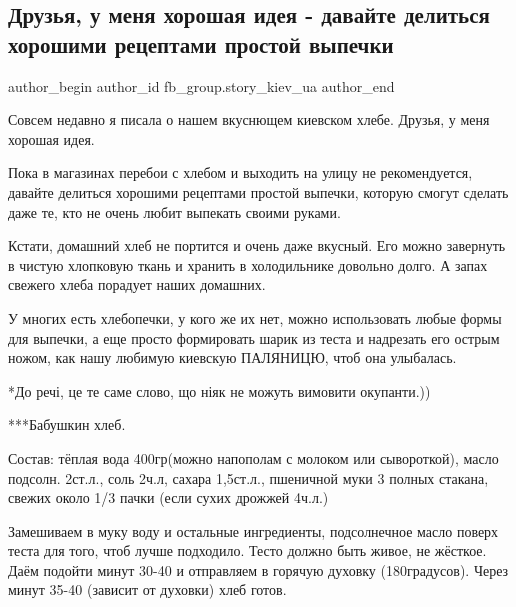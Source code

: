  
 
 
 
 
 
\subsection{Друзья, у меня хорошая идея - давайте делиться хорошими рецептами простой выпечки}
\label{sec:28_02_2022.fb.fb_group.story_kiev_ua.2.vypechka}
 
\ifcmt
 author_begin
   author_id fb_group.story_kiev_ua
 author_end
\fi

Совсем недавно я писала о нашем вкуснющем киевском хлебе. Друзья, у меня
хорошая идея. 

Пока в магазинах перебои с хлебом и выходить на улицу не рекомендуется, давайте
делиться хорошими рецептами простой выпечки, которую смогут сделать даже те,
кто не очень любит выпекать своими руками. 

Кстати, домашний хлеб не портится и очень даже вкусный. Его можно завернуть в
чистую хлопковую ткань и хранить в холодильнике довольно долго. А запах свежего
хлеба порадует наших домашних. 


У многих есть хлебопечки, у кого же их нет, можно использовать любые формы для
выпечки, а еще просто формировать шарик из теста и надрезать его острым ножом,
как нашу любимую киевскую ПАЛЯНИЦЮ, чтоб она улыбалась.

*До речі, це те саме слово, що ніяк не можуть вимовити окупанти.))

***Бабушкин хлеб.

Состав: тёплая вода 400гр(можно напополам с молоком или сывороткой), масло
подсолн. 2ст.л., соль 2ч.л, сахара 1,5ст.л., пшеничной муки 3 полных стакана,
свежих около 1/3 пачки (если сухих дрожжей 4ч.л.)

Замешиваем в муку воду и остальные ингредиенты, подсолнечное масло поверх теста
для того, чтоб лучше подходило. Тесто должно быть живое, не жёсткое. Даём
подойти минут 30-40 и отправляем в горячую духовку (180градусов). Через минут
35-40 (зависит от духовки)  хлеб готов.

